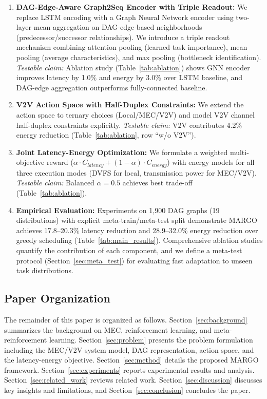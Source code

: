 \documentclass[journal,twoside]{IEEEtran}
\newcommand{\method}{\textsc{MARGO}}
\begin{document}
\begin{enumerate}
    \item \textbf{DAG-Edge-Aware Graph2Seq Encoder with Triple Readout:} We replace LSTM encoding with a Graph Neural Network encoder using two-layer mean aggregation on DAG-edge-based neighborhoods (predecessor/successor relationships). We introduce a triple readout mechanism combining attention pooling (learned task importance), mean pooling (average characteristics), and max pooling (bottleneck identification). \textit{Testable claim:} Ablation study (Table~\ref{tab:ablation}) shows GNN encoder improves latency by 1.0\% and energy by 3.0\% over LSTM baseline, and DAG-edge aggregation outperforms fully-connected baseline.
    
    \item \textbf{V2V Action Space with Half-Duplex Constraints:} We extend the action space to ternary choices (Local/MEC/V2V) and model V2V channel half-duplex constraints explicitly. \textit{Testable claim:} V2V contributes 4.2\% energy reduction (Table~\ref{tab:ablation}, row ``w/o V2V'').
    
    \item \textbf{Joint Latency-Energy Optimization:} We formulate a weighted multi-objective reward ($\alpha \cdot C_{latency} + (1-\alpha) \cdot C_{energy}$) with energy models for all three execution modes (DVFS for local, transmission power for MEC/V2V). \textit{Testable claim:} Balanced $\alpha=0.5$ achieves best trade-off (Table~\ref{tab:ablation}).
    
    \item \textbf{Empirical Evaluation:} Experiments on 1,900 DAG graphs (19 distributions) with explicit meta-train/meta-test split demonstrate \method{} achieves 17.8--20.3\% latency reduction and 28.9--32.0\% energy reduction over greedy scheduling (Table~\ref{tab:main_results}). Comprehensive ablation studies quantify the contribution of each component, and we define a meta-test protocol (Section~\ref{sec:meta_test}) for evaluating fast adaptation to unseen task distributions.
\end{enumerate}

\subsection{Paper Organization}

The remainder of this paper is organized as follows. Section~\ref{sec:background} summarizes the background on MEC, reinforcement learning, and meta-reinforcement learning. Section~\ref{sec:problem} presents the problem formulation including the MEC/V2V system model, DAG representation, action space, and the latency-energy objective. Section~\ref{sec:method} details the proposed \method{} framework. Section~\ref{sec:experiments} reports experimental results and analysis. Section~\ref{sec:related_work} reviews related work. Section~\ref{sec:discussion} discusses key insights and limitations, and Section~\ref{sec:conclusion} concludes the paper.
\end{document}
